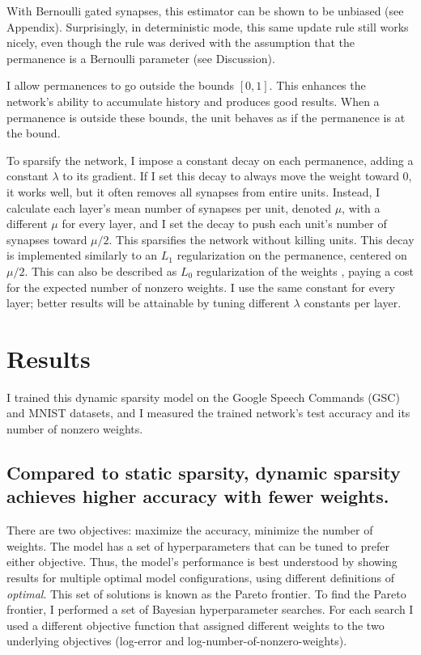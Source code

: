 \documentclass[11pt]{article}
\begin{document}
With Bernoulli gated synapses, this estimator can be shown to be unbiased (see Appendix). Surprisingly, in deterministic mode, this same update rule still works nicely, even though the rule was derived with the assumption that the permanence is a Bernoulli parameter (see Discussion).

I allow permanences to go outside the bounds \([0, 1]\). This enhances the network's ability to accumulate history and produces good results. When a permanence is outside these bounds, the unit behaves as if the permanence is at the bound.

To sparsify the network, I impose a constant decay on each permanence, adding a constant \(\lambda\) to its gradient. If I set this decay to always move the weight toward 0, it works well, but it often removes all synapses from entire units. Instead, I calculate each layer's mean number of synapses per unit, denoted \(\mu\), with a different \(\mu\) for every layer, and I set the decay to push each unit's number of synapses toward \(\mu/2\). This sparsifies the network without killing units. This decay is implemented similarly to an \(L_1\) regularization on the permanence, centered on \(\mu/2\). This can also be described as \(L_0\) regularization of the weights \citep{louizos2018learning}, paying a cost for the expected number of nonzero weights. I use the same constant for every layer; better results will be attainable by tuning different \(\lambda\) constants per layer.


\section{Results}
\label{sec:orgea40d05}

I trained this dynamic sparsity model on the Google Speech Commands (GSC) and MNIST datasets, and I measured the trained network's test accuracy and its number of nonzero weights.

\subsection{Compared to static sparsity, dynamic sparsity achieves higher accuracy with fewer weights.}
\label{sec:org3d43693}

There are two objectives: maximize the accuracy, minimize the number of weights. The model has a set of hyperparameters that can be tuned to prefer either objective. Thus, the model's performance is best understood by showing results for multiple optimal model configurations, using different definitions of \emph{optimal}. This set of solutions is known as the Pareto frontier. To find the Pareto frontier, I performed a set of Bayesian hyperparameter searches. For each search I used a different objective function that assigned different weights to the two underlying objectives (log-error and log-number-of-nonzero-weights).
\end{document}
